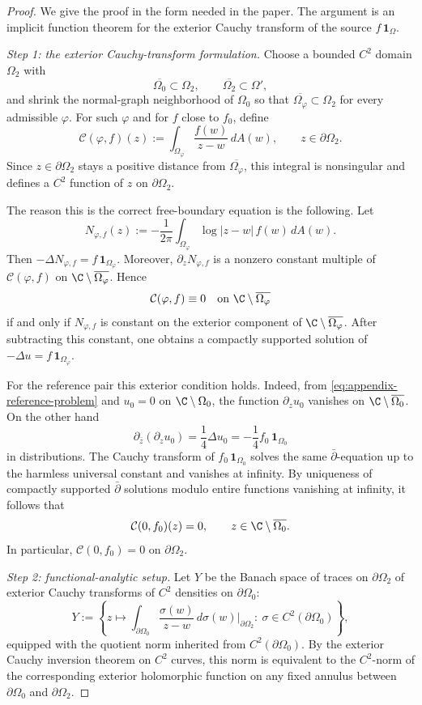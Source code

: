 \begin{proof}
We give the proof in the form needed in the paper. The argument is an implicit
function theorem for the exterior Cauchy transform of the source
\(f\,\mathbf 1_{\Omega}\).

\medskip
\noindent\emph{Step 1: the exterior Cauchy-transform formulation.}
Choose a bounded \(C^2\) domain \(\Omega_2\) with
\[
\overline{\Omega_0}\subset \Omega_2,\qquad
\overline{\Omega_2}\subset \Omega',
\]
and shrink the normal-graph neighborhood of \(\Omega_0\) so that
\(\overline{\Omega_\varphi}\subset\Omega_2\) for every admissible
\(\varphi\). For such \(\varphi\) and for \(f\) close to \(f_0\), define
\[
\mathcal C(\varphi,f)(z)
:=
\int_{\Omega_\varphi}\frac{f(w)}{z-w}\,dA(w),
\qquad z\in\partial\Omega_2 .
\]
Since \(z\in\partial\Omega_2\) stays a positive distance from
\(\overline{\Omega_\varphi}\), this integral is nonsingular and defines a
\(C^2\) function of \(z\) on \(\partial\Omega_2\).

The reason this is the correct free-boundary equation is the following. Let
\[
N_{\varphi,f}(z)
:=
-\frac1{2\pi}\int_{\Omega_\varphi}\log|z-w|\,f(w)\,dA(w).
\]
Then \(-\Delta N_{\varphi,f}=f\,\mathbf 1_{\Omega_\varphi}\). Moreover,
\(\partial_zN_{\varphi,f}\) is a nonzero constant multiple of
\(\mathcal C(\varphi,f)\) on \(\C\setminus\overline{\Omega_\varphi}\). Hence
\[
\mathcal C(\varphi,f)\equiv0
\quad\text{on }\C\setminus\overline{\Omega_\varphi}
\]
if and only if \(N_{\varphi,f}\) is constant on the exterior component of
\(\C\setminus\overline{\Omega_\varphi}\). After subtracting this constant,
one obtains a compactly supported solution of
\(-\Delta u=f\,\mathbf 1_{\Omega_\varphi}\).

For the reference pair this exterior condition holds. Indeed, from
\eqref{eq:appendix-reference-problem} and \(u_0=0\) on
\(\C\setminus\Omega_0\), the function \(\partial_z u_0\) vanishes on
\(\C\setminus\overline{\Omega_0}\). On the other hand
\[
\partial_{\bar z}(\partial_z u_0)
=\frac14\Delta u_0
=-\frac14 f_0\,\mathbf 1_{\Omega_0}
\]
in distributions. The Cauchy transform of \(f_0\,\mathbf 1_{\Omega_0}\) solves
the same \(\bar\partial\)-equation up to the harmless universal constant and
vanishes at infinity. By uniqueness of compactly supported \(\bar\partial\)
solutions modulo entire functions vanishing at infinity, it follows that
\[
\mathcal C(0,f_0)(z)=0,
\qquad z\in\C\setminus\overline{\Omega_0}.
\]
In particular, \(\mathcal C(0,f_0)=0\) on \(\partial\Omega_2\).

\medskip
\noindent\emph{Step 2: functional-analytic setup.}
Let \(Y\) be the Banach space of traces on \(\partial\Omega_2\) of exterior
Cauchy transforms of \(C^2\) densities on \(\partial\Omega_0\):
\[
Y:=
\left\{
z\mapsto
\int_{\partial\Omega_0}\frac{\sigma(w)}{z-w}\,d\sigma(w)
\Big|_{\partial\Omega_2}
:\ \sigma\in C^2(\partial\Omega_0)
\right\},
\]
equipped with the quotient norm inherited from \(C^2(\partial\Omega_0)\). By
the exterior Cauchy inversion theorem on \(C^2\) curves, this norm is
equivalent to the \(C^2\)-norm of the corresponding exterior holomorphic
function on any fixed annulus between \(\partial\Omega_0\) and
\(\partial\Omega_2\).


\end{proof}
